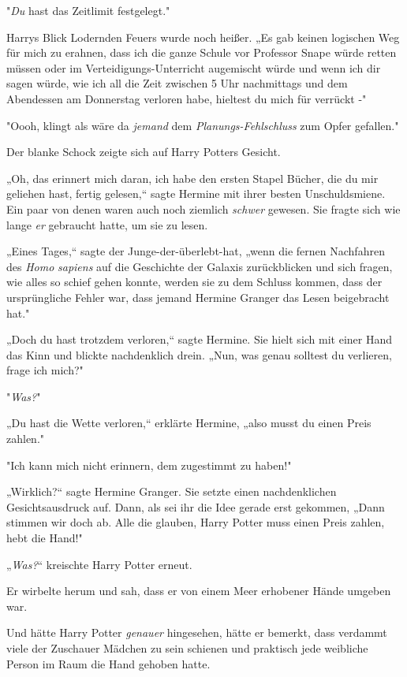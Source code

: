 {"\emph{Du} hast das Zeitlimit festgelegt."

Harrys Blick Lodernden Feuers wurde noch heißer. „Es gab keinen logischen Weg für mich zu erahnen, dass ich die ganze Schule vor Professor Snape würde retten müssen oder im Verteidigungs-Unterricht augemischt würde und wenn ich dir sagen würde, wie ich all die Zeit zwischen 5 Uhr nachmittags und dem Abendessen am Donnerstag verloren habe, hieltest du mich für verrückt -"

"Oooh, klingt als wäre da \emph{jemand} dem \emph{Planungs-Fehlschluss} zum Opfer gefallen."

Der blanke Schock zeigte sich auf Harry Potters Gesicht.

„Oh, das erinnert mich daran, ich habe den ersten Stapel Bücher, die du mir geliehen hast, fertig gelesen,“ sagte Hermine mit ihrer besten Unschuldsmiene. Ein paar von denen waren auch noch ziemlich \emph{schwer} gewesen. Sie fragte sich wie lange \emph{er} gebraucht hatte, um sie zu lesen.

„Eines Tages,“ sagte der Junge-der-überlebt-hat, „wenn die fernen Nachfahren des \emph{Homo} \emph{sapiens} auf die Geschichte der Galaxis zurückblicken und sich fragen, wie alles so schief gehen konnte, werden sie zu dem Schluss kommen, dass der ursprüngliche Fehler war, dass jemand Hermine Granger das Lesen beigebracht hat."

„Doch du hast trotzdem verloren,“ sagte Hermine. Sie hielt sich mit einer Hand das Kinn und blickte nachdenklich drein. „Nun, was genau solltest du verlieren, frage ich mich?"

"\emph{Was?}"

„Du hast die Wette verloren,“ erklärte Hermine, „also musst du einen Preis zahlen."

"Ich kann mich nicht erinnern, dem zugestimmt zu haben!"

„Wirklich?“ sagte Hermine Granger. Sie setzte einen nachdenklichen Gesichtsausdruck auf. Dann, als sei ihr die Idee gerade erst gekommen, „Dann stimmen wir doch ab. Alle die glauben, Harry Potter muss einen Preis zahlen, hebt die Hand!"

„\emph{Was?}“ kreischte Harry Potter erneut.

Er wirbelte herum und sah, dass er von einem Meer erhobener Hände umgeben war.

Und hätte Harry Potter \emph{genauer} hingesehen, hätte er bemerkt, dass verdammt viele der Zuschauer Mädchen zu sein schienen und praktisch jede weibliche Person im Raum die Hand gehoben hatte.

}
